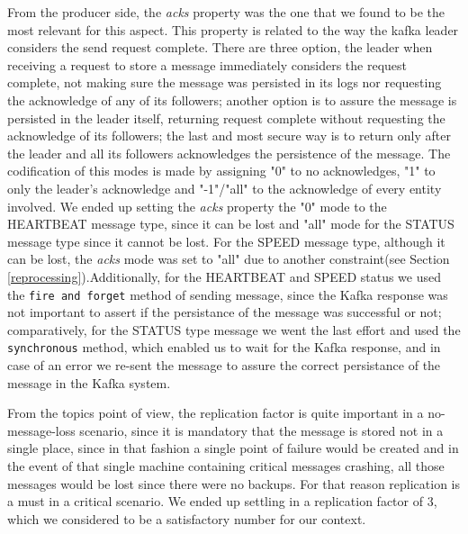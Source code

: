 \documentclass[12pt]{article}
\begin{document}
From the producer side, the \textit{acks} property was the one that we found to be the most relevant for this aspect. This property is related to the way the kafka leader considers the send request complete. There are three option, the leader when receiving a request to store a message immediately considers the request complete, not making sure the message was persisted in its logs nor requesting the acknowledge of any of its followers; another option is to assure the message is persisted in the leader itself, returning request complete without requesting the acknowledge of its followers; the last and most secure way is to return only after the leader and all its followers acknowledges the persistence of the message. The codification of this modes is made by assigning "0" to no acknowledges, "1" to only the leader's acknowledge and "-1"/"all" to the acknowledge of every entity involved. We ended up setting the \textit{acks} property the "0" mode to the HEARTBEAT message type, since it can be lost and "all" mode for the STATUS message type since it cannot be lost. For the SPEED message type, although it can be lost, the \textit{acks} mode was set to "all" due to another constraint(see Section \ref{reprocessing}).Additionally, for the HEARTBEAT and SPEED status we used the \texttt{fire and forget} method of sending message, since the Kafka response was not important to assert if the persistance of the message was successful or not; comparatively, for the STATUS type message we went the last effort and used the \texttt{synchronous} method, which enabled us to wait for the Kafka response, and in case of an error we re-sent the message to assure the correct persistance of the message in the Kafka system.

From the topics point of view, the replication factor is quite important in a no-message-loss scenario, since it is mandatory that the message is stored not in a single place, since in that fashion a single point of failure would be created and in the event of that single machine containing critical messages crashing, all those messages would be lost since there were no backups. For that reason replication is a must in a critical scenario. We ended up settling in a replication factor of 3, which we considered to be a satisfactory number for our context.
\end{document}
